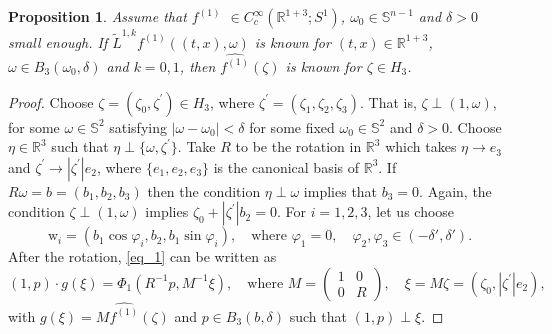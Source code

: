 \documentclass[11pt,a4paper,reqno]{amsart}
\newtheorem{proposition}[definition]
{Proposition}
\newcommand{\R}{\mathbb{R}}
\newcommand{\om}{\omega}
\newcommand{\sn}{\mathbb{S}^{n-1}}
\newcommand{\w}{\mathrm{w}}
\begin{document}
	\begin{proposition}\label{rec_roof_f3}
		Assume that $f^{(1)}$ $\in C_{c}^{\infty}(\mathbb{R}^{1+3};S^{1})$, $\om_0 \in \sn$ and $\delta>0$ small enough. If $\tilde{L}^{1,k}f^{(1)}((t,x),\omega )$ is known for $(t,x)\in \mathbb{R}^{1+3}$, $\omega \in B_{3}(\om_0,\delta)$ and $k=0,1$, then $\widehat{f^{(1)}}(\zeta)$ is known for $\zeta \in H_3$.
	\end{proposition}
	\begin{proof}
		Choose $\zeta=(\zeta_{0},\zeta^{'})\in H_3$, where $\zeta^{'}=(\zeta_{1},\zeta_{2},\zeta_{3})$. 
		That is, $\zeta \perp (1,\omega)$, for some $\omega \in \mathbb{S}^{2}$ satisfying $|\omega  -\omega_{0}|<\delta$ for some fixed $\omega_{0}\in \mathbb{S}^{2}$ and $\delta>0$. 
		Choose $\eta \in \mathbb{R}^{3}$ such that $\eta \perp \{\omega,\zeta^{'}\}$. 
		Take $R$ to be the rotation in $\mathbb{R}^{3}$ which takes $\eta \to e_{3}$ and $\zeta^{'}\to |\zeta^{'}|e_{2}$, where $\{e_1,e_2,e_3\}$ is the canonical basis of $\R^3$. 
		If $R\om = b = (b_1,b_2,b_3)$ then the condition $\eta \perp \omega$ implies that $b_3=0$. Again, the condition $\zeta \perp (1,\omega)$ implies $\zeta_{0}+|\zeta^{'}|b_2=0$.
		For $i=1,2,3$, let us choose 
		\begin{equation}\label{phi_i_3}
		\w_{i}=(b_1\cos\varphi_{i},b_2,b_1\sin\varphi_i), \quad \mbox{where }\varphi_1=0, \quad \varphi_2,\varphi_3 \in (-\delta',\delta').
		\end{equation}
		After the rotation, \eqref{eq_1} can be written as
		\begin{equation}\label{eq3}
			(1,p)\cdot g(\xi)=\Phi_1(R^{-1}p,M^{-1}\xi),\quad \mbox{where } 
			M=\begin{pmatrix}
				1&0\\
				0&R
			\end{pmatrix}, \quad \xi=M\zeta=(\zeta_{0},|\zeta^{'}|e_2),
			\quad 
		\end{equation}
		with $g(\xi) = M\widehat{f^{(1)}}(\zeta)$ and $p\in B_3(b,\delta)$ such that $(1,p) \perp \xi$.
		

\end{proof}
\end{document}
